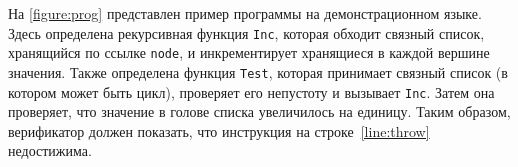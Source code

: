 \begin{exmp}\label{exmp:prog}
На \autoref{figure:prog} представлен пример программы на демонстрационном языке. Здесь определена рекурсивная функция \texttt{Inc}, которая обходит связный список, хранящийся по ссылке \texttt{node}, и инкрементирует хранящиеся в каждой вершине значения. Также определена функция \texttt{Test}, которая принимает связный список (в котором может быть цикл), проверяет его непустоту и вызывает \texttt{Inc}. Затем она проверяет, что значение в голове списка увеличилось на единицу. Таким образом, верификатор должен показать, что инструкция \kwdfail{} на строке~\ref{line:throw} недостижима.
\end{exmp}
